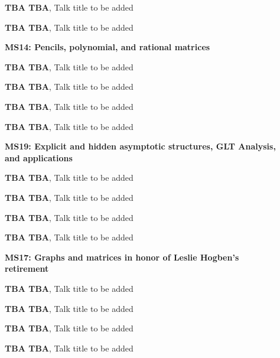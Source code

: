 \documentclass[ILAS2025-program.tex]{subfiles}
\begin{document}
\begin{description}
\begin{description}
        \item[] \textbf{TBA TBA}, Talk title to be added
        \item[] \textbf{TBA TBA}, Talk title to be added
        \end{description}
    \begin{description}
    \item[] \textbf{MS14: Pencils, polynomial, and rational matrices} 
    \item[] \textbf{TBA TBA}, Talk title to be added
        \item[] \textbf{TBA TBA}, Talk title to be added
        \item[] \textbf{TBA TBA}, Talk title to be added
        \item[] \textbf{TBA TBA}, Talk title to be added
        \end{description}
    \begin{description}
    \item[] \textbf{MS19: Explicit and hidden asymptotic structures, GLT Analysis, and applications} 
    \item[] \textbf{TBA TBA}, Talk title to be added
        \item[] \textbf{TBA TBA}, Talk title to be added
        \item[] \textbf{TBA TBA}, Talk title to be added
        \item[] \textbf{TBA TBA}, Talk title to be added
        \end{description}
    \begin{description}
    \item[] \textbf{MS17: Graphs and matrices in honor of Leslie Hogben's retirement} 
    \item[] \textbf{TBA TBA}, Talk title to be added
        \item[] \textbf{TBA TBA}, Talk title to be added
        \item[] \textbf{TBA TBA}, Talk title to be added
        \item[] \textbf{TBA TBA}, Talk title to be added
        \end{description}

\end{description}
\end{document}
